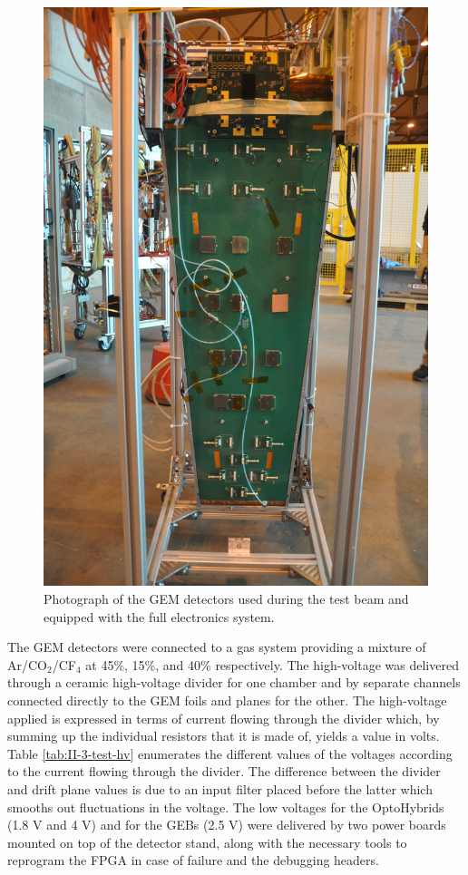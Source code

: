       \begin{figure}[p!]
        \centering
        \includegraphics[width=\textwidth]{img/II-3-test-beam/test-geb.jpg}
        \caption{Photograph of the GEM detectors used during the test beam and equipped with the full electronics system.}
        \label{fig:II-3-test-geb}
      \end{figure}

      The GEM detectors were connected to a gas system providing a mixture of Ar/CO$_2$/CF$_4$ at 45\%, 15\%, and 40\% respectively. The high-voltage was delivered through a ceramic high-voltage divider for one chamber and by separate channels connected directly to the GEM foils and planes for the other. The high-voltage applied is expressed in terms of current flowing through the divider which, by summing up the individual resistors that it is made of, yields a value in volts. Table \ref{tab:II-3-test-hv} enumerates the different values of the voltages according to the current flowing through the divider. The difference between the divider and drift plane values is due to an input filter placed before the latter which smooths out fluctuations in the voltage. The low voltages for the OptoHybrids (1.8 V and 4 V) and for the GEBs (2.5 V) were delivered by two power boards mounted on top of the detector stand, along with the necessary tools to reprogram the FPGA in case of failure and the debugging headers. \\

